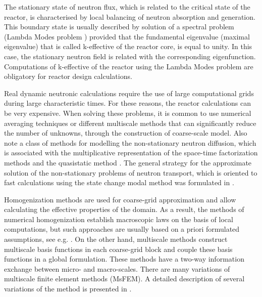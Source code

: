 \documentclass[10pt]{article}
\begin{document}
The stationary state of neutron flux, which is related to the critical state of the reactor, is characterised by local balancing of neutron absorption and generation. 
This boundary state is usually described by solution of a spectral problem (Lambda Modes problem \cite{Verdu1994, Annals2017, Munoz2019}) provided that the fundamental eigenvalue (maximal eigenvalue) that is called k-effective of the reactor core, is equal to unity. 
In this case, the stationary neutron field is related with the corresponding eigenfunction.
Computations of k-effective of the reactor using the Lambda Modes problem are obligatory for reactor design calculations.

Real dynamic neutronic calculations require the use of large computational grids during large characteristic times. For these reasons, the reactor calculations can be very expensive.
When solving these problems, it is common to use numerical averaging techniques or different multiscale methods that can significantly reduce the number of unknowns, through the construction of coarse-scale model.
Also note a class of methods for modelling the non-stationary  neutron diffusion, which is associated with the multiplicative representation of the space-time factorization methods and the quasistatic method \cite{dulla2008quasi, Carreno2019}. 
The general strategy for the approximate solution of the non-stationary problems of neutron transport, which is oriented to fast calculations using the state change modal method was formulated in \cite{Progress2018}.

Homogenization methods are used for coarse-grid approximation and allow calculating the effective properties of the domain.
As a result, the methods of numerical homogenization establish macroscopic laws on the basis of local computations, but such approaches are usually based on a priori formulated assumptions, see e.g. \cite{Stalnov2017,Bakhvalov2012, Vidal2018}. 
On the other hand, multiscale methods construct multiscale basis functions in each coarse-grid block and couple these basis functions in a global formulation. 
These methods have a two-way information exchange between micro- and macro-scales. 
There are many variations of multiscale finite element methods (MsFEM).
A detailed description of several variations of the method is presented in \cite{Efendiev2009}.
\end{document}
